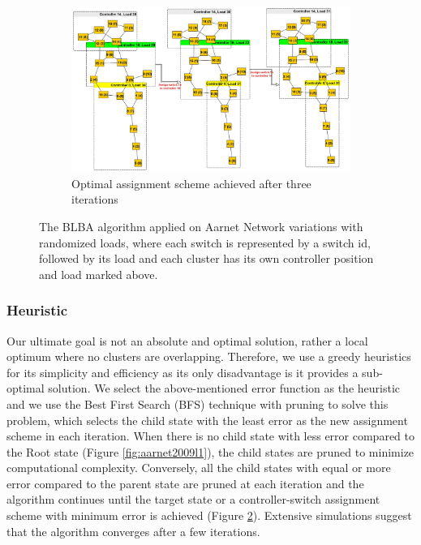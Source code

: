 \documentclass[final,5p,times]{cas-dc}
\begin{document}
\begin{figure}
		~
		\begin{subfigure}{\textwidth}
			\includegraphics[width=\linewidth]{Images/Aarnet_Load_2.jpg}
			\caption{Optimal assignment scheme achieved after three iterations}
			\label{fig:aarnet2009l2}
		\end{subfigure}
		\caption{The BLBA algorithm applied on Aarnet Network variations with randomized loads, where each switch is represented by a switch id, followed by its load and each cluster has its own controller position and load marked above.}
	\end{figure}

	\subsubsection{Heuristic}
	Our ultimate goal is not an absolute and optimal solution, rather a local optimum where no clusters are overlapping. Therefore, we use a greedy heuristics for its simplicity and efficiency as its only disadvantage is it provides a sub-optimal solution. We select the above-mentioned error function as the heuristic and we use the Best First Search (BFS) technique with pruning to solve this problem, which selects the child state with the least error as the new assignment scheme in each iteration. When there is no child state with less error compared to the Root state (Figure \ref{fig:aarnet2009l1}), the child states are pruned to minimize computational complexity. Conversely, all the child states with equal or more error compared to the parent state are pruned at each iteration and the algorithm continues until the target state or a controller-switch assignment scheme with minimum error is achieved  (Figure \ref{fig:aarnet2009l2}). Extensive simulations suggest that the algorithm converges after a few iterations.
	
\end{document}
